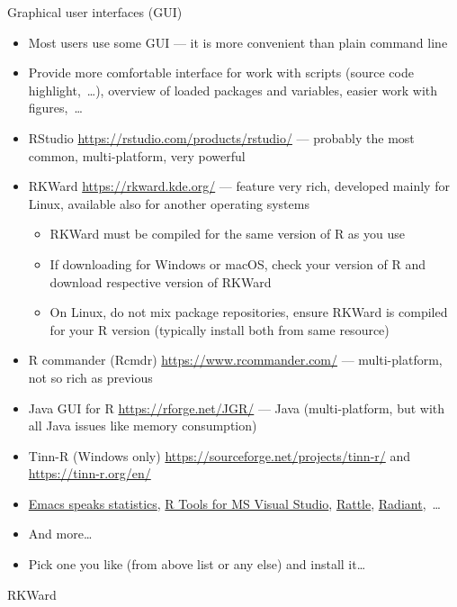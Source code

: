 \documentclass[compress, ucs, xelatex, 11pt, xcolor=svgnames, aspectratio=169,
	hyperref={
		bookmarks=true,
		unicode=true,
		colorlinks=true,
		pdftitle={Molecular data in R},
		plainpages=false,
		pdfauthor={Vojtech Zeisek},
		pdfsubject={Course about phylogeny and evolution in R},
		pdfcreator={XeLaTeX},
		pdfkeywords={R, evolution, phylogeny, molecular data},
		linkcolor=Crimson, %
		anchorcolor=Magenta, %
		citecolor=Magenta, %
		filecolor=Magenta, %
		menucolor=Magenta, %
		urlcolor=DodgerBlue, %
		pdftex},
	url={hyphens, lowtilde} %
	]{beamer}
\renewcommand{\texttt}[1]{\colorbox{Beige}{{\ttfamily #1}}}
\begin{document}
\begin{frame}[allowframebreaks]{Graphical user interfaces (GUI)}
	\label{gui}
	\begin{itemize}
		\item Most users use some GUI --- it is more convenient than plain command line
		\item Provide more comfortable interface for work with scripts (source code highlight,~\ldots), overview of loaded packages and variables, easier work with figures,~\ldots
		\item RStudio \url{https://rstudio.com/products/rstudio/} --- probably the most common, multi-platform, very powerful
		\item RKWard \url{https://rkward.kde.org/} --- feature very rich, developed mainly for Linux, available also for another operating systems
		\begin{itemize}
			\item RKWard must be compiled for the same version of R as you use
			\item If downloading for Windows or macOS, check your version of R and download respective version of RKWard
			\item On Linux, do not mix package repositories, ensure RKWard is compiled for your R version (typically install both from same resource)
		\end{itemize}
		\item R commander (Rcmdr) \url{https://www.rcommander.com/} --- multi-platform, not so rich as previous
		\item Java GUI for R \url{https://rforge.net/JGR/} --- Java (multi-platform, but with all Java issues like memory consumption)
		\item Tinn-R (Windows only) \url{https://sourceforge.net/projects/tinn-r/} and \url{https://tinn-r.org/en/}
		\item \href{https://ess.r-project.org/}{Emacs speaks statistics}, \href{https://docs.microsoft.com/visualstudio/rtvs}{R Tools for MS Visual Studio}, \href{https://rattle.togaware.com/}{Rattle}, \href{https://radiant-rstats.github.io/docs/}{Radiant},~\ldots
		\item And more\ldots
		\item Pick one you like (from above list or any else) and install it\ldots
	\end{itemize}
\end{frame}

\begin{frame}{RKWard}
	\begin{center}
		\texttt{[image: rkward.jpg]}
	\end{center}
\end{frame}
\end{document}
